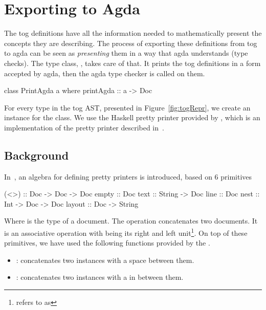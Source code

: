 \section{Exporting to Agda}
\label{sec:exporting_agda}
The tog definitions have all the information needed to mathematically present the concepts they are describing. The process of exporting these definitions from tog to agda can be seen as \emph{presenting} them in a way that agda understands (type checks). The type class, , takes care of that. It prints the tog definitions in a form accepted by agda, then the agda type checker is called on them. 
\begin{hscode}
class PrintAgda a where
  printAgda ::  a -> Doc   
\end{hscode}
For every type in the tog AST, presented in Figure~\ref{fig:togRepr}, we create an instance for the  class. 
We use the Haskell pretty printer provided by , which is an implementation of the pretty printer described in~\cite{wadler2003prettier}. 

\subsection{Background}
In~\cite{wadler2003prettier}, an algebra for defining pretty printers is introduced, based on $6$ primitives 
\begin{hscode}
(<>) :: Doc -> Doc -> Doc 
empty  :: Doc 
text :: String -> Doc 
line :: Doc 
nest :: Int -> Doc -> Doc 
layout :: Doc -> String 
\end{hscode}
Where  is the type of a document. The \lstmath{(<>)} operation concatenates two documents. It is an associative operation with  being its right and left unit\footnote{\cite{wadler2003prettier} refers to  as }. 
On top of these primitives, we have used the following functions provided by the 
. 
\begin{itemize}
\item \lstmath{(<+>)} : concatenates two  instances with a space between them. 
\item \lstmath{(<$\$$>)} : concatenates two  instances with a  in between them. 
\end{itemize}

